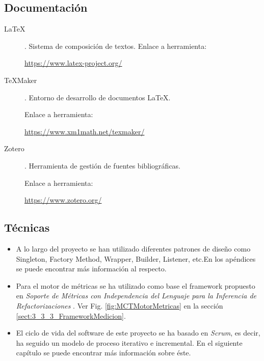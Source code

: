 \subsection{Documentación}
\begin{description}
	\item[LaTeX]. Sistema de composición de textos.
		Enlace a herramienta:
		
		\url{https://www.latex-project.org/}
		
	\item[TeXMaker]. Entorno de desarrollo de documentos LaTeX.
	
		Enlace a herramienta:
		
		\url{https://www.xm1math.net/texmaker/}
	
	\item[Zotero]. Herramienta de gestión de fuentes bibliográficas.
		
		Enlace a herramienta:
		
		\url{https://www.zotero.org/}
	
\end{description}
\subsection{Técnicas}
\begin{itemize}
	\item A lo largo del proyecto se han utilizado diferentes patrones de diseño \cite{gamma_patrones_2002} como Singleton, Factory Method, Wrapper, Builder, Listener, etc.En los apéndices se puede encontrar más información al respecto.
	
	\item Para el motor de métricas se ha utilizado como base el framework propuesto en \textit{Soporte de Métricas con Independencia del Lenguaje para la Inferencia de Refactorizaciones} \cite{marticorena_sanchez_soporte_2005}. Ver Fig. \ref{fig:MCTMotorMetricas} en la sección \ref{sect:3_3_3_FrameworkMedicion}.
	
	\item El ciclo de vida del software de este proyecto se ha basado en \textit{Scrum}\cite{scrum_master_scrum_2019}, es decir, ha seguido un modelo de proceso iterativo e incremental. En el siguiente capítulo se puede encontrar más información sobre éste.
\end{itemize}
